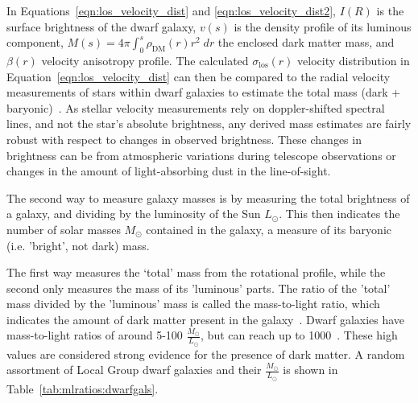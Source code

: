 In Equations~\ref{eqn:los_velocity_dist} and \ref{eqn:los_velocity_dist2}, $I(R)$ is the surface brightness of the dwarf galaxy, $v(s)$ is the density profile of its luminous component, $M(s)=4\pi \int_0^s \rho_{\textrm{DM}}(r) r^2 \; dr$ the enclosed dark matter mass, and $\beta(r)$ velocity anisotropy profile.
The calculated $\sigma_{\mathrm{los}}(r)$ velocity distribution in Equation~\ref{eqn:los_velocity_dist} can then be compared to the radial velocity measurements of stars within dwarf galaxies to estimate the total mass (dark + baryonic)~\cite{dwarf_gal_vel_dispersion,dwarf_gal_vel_dispersion_a,dwarf_jfactors_no_priors}.
As stellar velocity measurements rely on doppler-shifted spectral lines, and not the star's absolute brightness, any derived mass estimates are fairly robust with respect to changes in observed brightness.
These changes in brightness can be from atmospheric variations during telescope observations or changes in the amount of light-absorbing dust in the line-of-sight.

The second way to measure galaxy masses is by measuring the total brightness of a galaxy, and dividing by the luminosity of the Sun $L_\odot$.
This then indicates the number of solar masses $M_\odot$ contained in the galaxy, a measure of its baryonic (i.e. 'bright', not dark) mass.
    
The first way measures the `total' mass from the rotational profile, while the second only measures the mass of its 'luminous' parts.
The ratio of the 'total' mass divided by the 'luminous' mass is called the mass-to-light ratio, which indicates the amount of dark matter present in the galaxy~\cite{faber_ml}.
Dwarf galaxies have mass-to-light ratios of around 5-100 $\frac{M_\odot}{L_\odot}$, but can reach up to \nicetilde \SI{1000}{}~\cite{Simon2007_dwarfgalaxykeck}.
These high values are considered strong evidence for the presence of dark matter.
A random assortment of Local Group dwarf galaxies and their $\frac{M_\odot}{L_\odot}$ is shown in Table~\ref{tab:mlratios:dwarfgals}.
    
